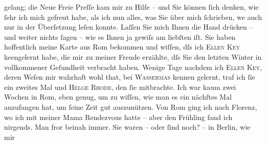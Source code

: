 \begin{ledgroupsized}[t]{13cm}
                    gelang; die Neue Freie Preſſe kam mir zu Hilfe – und Sie können ſich
                    denken, wie ſehr ich mich gefreut habe, als ich nun alles, was Sie über mich
                    ſchrieben, we{\geminationn} auch nur in der Überſetzung leſen
                    konnte. Laſſen Sie mich Ihnen die Hand drücken – und {\pb}weiter nichts ſagen – wie es Ihnen ja gewiſs
                    am liebſten iſt.\pend
           \pstart
           Sie haben hoffentlich meine Karte aus Rom
                    bekommen und wiſſen, dſs ich \textsc{Ellen Key} ke{\geminationn}engelernt habe, die mir zu meiner Freude
                    erzählte, dſs Sie den letzten Winter in vollkommener Geſundheit verbracht haben.
                    Wenige Tage nachdem ich \textsc{Ellen Key}, deren Weſen mir wahrhaft wohl that, bei \textsc{Wasserma{\geminationn}s} kennen gelernt, traf ich ſie ein zweites Mal und {\pb}\textsc{Helge Rhode}, den ſie mitbrachte. Ich war kaum zwei Wochen in Rom, eben genug, um zu wiſſen, wie man es ein nächſtes Mal
                    anzufangen hat, um ſeine Zeit gut auszunützen. Von Rom ging ich nach Florenz, wo ich mit
                    meiner Mama Rendezvous
                    hatte – aber den Frühling fand ich nirgends. Man fror beinah immer.\pend
           \pstart
           Sie waren – oder ſind noch? – in Berlin, wie mir

\end{ledgroupsized}
